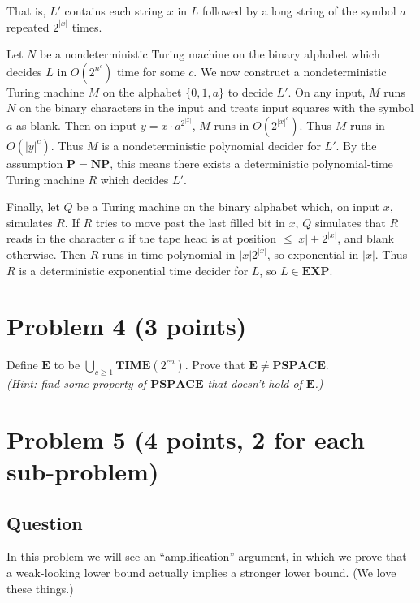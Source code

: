 \documentclass{article}
\renewcommand{\P}{\mathbf{P}}
\newcommand{\NP}{\mathbf{NP}}
\newcommand{\EXP}{\mathbf{EXP}}
\newcommand{\PSPACE}{\mathbf{PSPACE}}
\newcommand{\TIME}{\mathbf{TIME}}
\begin{document}
	That is, $L'$ contains each string $x$ in $L$ followed by a long string of the symbol $a$ repeated $2^{|x|}$ times.
	
	Let $N$ be a nondeterministic Turing machine on the binary alphabet which decides $L$ in $O(2^{n^c})$ time for some $c$.
	We now construct a nondeterministic Turing machine $M$ on the alphabet $\{0, 1, a\}$ to decide $L'$.
	On any input, $M$ runs $N$ on the binary characters in the input and treats input squares with the symbol $a$ as blank.
	Then on input $y = x \cdot a^{2^{|x|}}$, $M$ runs in $O(2^{|x|^c})$.  Thus $M$ runs 
	in $O(|y|^c)$.
	Thus $M$ is a nondeterministic polynomial decider for $L'$.
	By the assumption $\P = \NP$, this means there exists a deterministic polynomial-time Turing machine $R$ which decides $L'$.

	Finally, let $Q$ be a Turing machine on the binary alphabet which, on input $x$, simulates $R$.
	If $R$ tries to move past the last filled bit in $x$, $Q$ simulates that $R$ reads in the character $a$ if the tape head is at position $\leq |x| + 2^{|x|}$, and blank otherwise.
	Then $R$ runs in time polynomial in $|x| 2^{|x|}$, so exponential in $|x|$.  Thus $R$ is a deterministic exponential time decider for $L$, so $L \in \EXP$.


    \section*{Problem 4 (3 points)}
    Define $\mathbf{E}$ to be $\bigcup_{c\ge 1} \TIME(2^{cn})$. Prove that $\mathbf{E} \neq \PSPACE$.\\
    \emph{(Hint: find some property of $\PSPACE$ that doesn't hold of $\mathbf{E}$.)}
    
	\section*{Problem 5 (4 points, 2 for each sub-problem)}
	
	\subsection*{Question}

	In this problem we will see an ``amplification'' argument, in which we prove that a weak-looking lower bound actually implies a stronger lower bound. (We love these things.)
	
\end{document}
